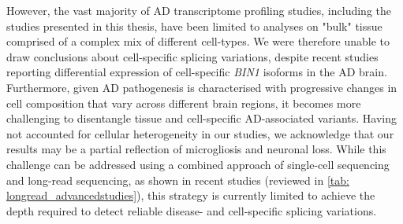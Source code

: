 However, the vast majority of AD transcriptome profiling studies, including the studies presented in this thesis, have been limited to analyses on "bulk" tissue comprised of a complex mix of different cell-types. We were therefore unable to draw conclusions about cell-specific splicing variations, despite recent studies reporting differential expression of cell-specific \textit{BIN1} isoforms in the AD brain. Furthermore, given AD pathogenesis is characterised with progressive changes in cell composition that vary across different brain regions, it becomes more challenging to disentangle tissue and cell-specific AD-associated variants. Having not accounted for cellular heterogeneity in our studies, we acknowledge that our results may be a partial reflection of microgliosis and neuronal loss. While this challenge can be addressed using a combined approach of single-cell sequencing and long-read sequencing, as shown in recent studies (reviewed in \cref{tab: longread_advancedstudies}), this strategy is currently limited to achieve the depth required to detect reliable disease- and cell-specific splicing variations. 
 
